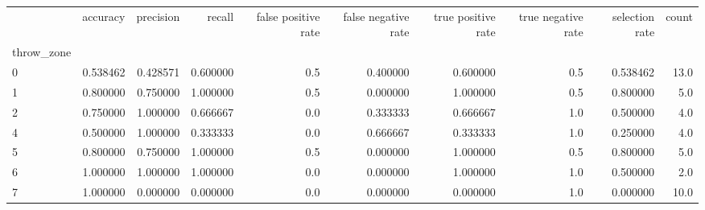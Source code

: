 \begin{tabular}{lrrrrrrrrr}
\toprule
{} &  accuracy &  precision &    recall &  false positive rate &  false negative rate &  true positive rate &  true negative rate &  selection rate &  count \\
throw\_zone &           &            &           &                      &                      &                     &                     &                 &        \\
\midrule
0          &  0.538462 &   0.428571 &  0.600000 &                  0.5 &             0.400000 &            0.600000 &                 0.5 &        0.538462 &   13.0 \\
1          &  0.800000 &   0.750000 &  1.000000 &                  0.5 &             0.000000 &            1.000000 &                 0.5 &        0.800000 &    5.0 \\
2          &  0.750000 &   1.000000 &  0.666667 &                  0.0 &             0.333333 &            0.666667 &                 1.0 &        0.500000 &    4.0 \\
4          &  0.500000 &   1.000000 &  0.333333 &                  0.0 &             0.666667 &            0.333333 &                 1.0 &        0.250000 &    4.0 \\
5          &  0.800000 &   0.750000 &  1.000000 &                  0.5 &             0.000000 &            1.000000 &                 0.5 &        0.800000 &    5.0 \\
6          &  1.000000 &   1.000000 &  1.000000 &                  0.0 &             0.000000 &            1.000000 &                 1.0 &        0.500000 &    2.0 \\
7          &  1.000000 &   0.000000 &  0.000000 &                  0.0 &             0.000000 &            0.000000 &                 1.0 &        0.000000 &   10.0 \\
\bottomrule
\end{tabular}
